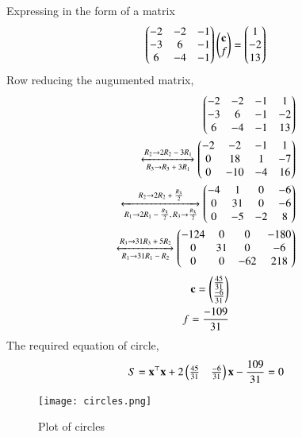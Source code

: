 \documentclass[journal,12pt,twocolumn]{IEEEtran}
\begin{document}
Expressing in the form of a matrix
\begin{align}
    \begin{pmatrix}-2&-2&-1\\-3&6&-1\\6&-4&-1\end{pmatrix}\begin{pmatrix}\mathbf{c}\\f\end{pmatrix} = \begin{pmatrix}1\\-2\\13\end{pmatrix}
\end{align}
Row reducing the augumented matrix,
\begin{align}
    \begin{pmatrix}-2&-2&-1&1\\-3&6&-1&-2\\6&-4&-1&13\end{pmatrix} \\ \xleftrightarrow[\text{$R_3$}\rightarrow{\text{$R_3 + 3R_1$}}] {\text{$R_2$}\rightarrow{\text{$2R_2 - 3R_1$}}} \begin{pmatrix}-2&-2&-1&1\\0&18&1&-7\\0&-10&-4&16\end{pmatrix}\\
    \xleftrightarrow[\text{$R_1$}\rightarrow{\text{$2R_1 - \frac{R_3}{2}$}} \text{$,R_3$}\rightarrow{\text{$\frac{R_3}{2}$}} ] {\text{$R_2$}\rightarrow{\text{$2R_2 + \frac{R_3}{2}$}}} \begin{pmatrix}-4&1&0&-6\\0&31&0&-6\\0&-5&-2&8\end{pmatrix}\\
    \xleftrightarrow[\text{$R_1$}\rightarrow{\text{$31R_1 - R_2$}}] {\text{$R_3$}\rightarrow{\text{$31R_3 + 5R_2$}}} \begin{pmatrix}-124&0&0&-180\\0&31&0&-6\\0&0&-62&218\end{pmatrix}
\end{align}
\begin{align}
    \mathbf{c} = \begin{pmatrix}\frac{45}{31}\\\frac{-6}{31}\end{pmatrix}\\
    f = \frac{-109}{31}
\end{align}
The required equation of circle,
\begin{align}
    S = \mathbf{x}^\top\mathbf{x} + 2\begin{pmatrix}\frac{45}{31}&\frac{-6}{31}\end{pmatrix}\mathbf{x} - \frac{109}{31} = 0
\end{align}
\begin{figure}[h!]
\centering
\texttt{[image: circles.png]}
\caption{Plot of circles}
\label{fig:circles plot}
\end{figure}
\end{document}
